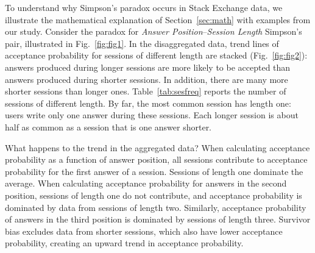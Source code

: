 To understand why Simpson's paradox occurs in Stack Exchange data, we illustrate the mathematical explanation of Section~\ref{sec:math} with examples from our study.
Consider the paradox for \textit{Answer Position}--\textit{Session Length} Simpson's pair, illustrated in Fig.~\ref{fig:fig1}.
In the disaggregated data, trend lines of acceptance probability for sessions of different length are stacked (Fig.~\ref{fig:fig2}): answers produced during longer sessions are more likely to be accepted than answers produced during shorter sessions. In addition, there are many more shorter sessions than longer ones. Table~\ref{tab:sesfreq} reports the number of sessions of different length. By far, the most common session has length one: users write only one answer during these sessions. Each longer session is about half as common as a session that is one answer shorter.

What happens to the trend in the aggregated data?
When calculating acceptance probability as a function of answer position, all sessions contribute to acceptance probability for the first answer of a session. Sessions of length one dominate the average. When calculating acceptance probability for answers in the second position, sessions of length one do not contribute, and acceptance probability is dominated by data from sessions of length two. Similarly, %
acceptance probability of answers in the third position is dominated by sessions of length three. Survivor bias excludes data from shorter sessions, which also have lower acceptance probability, %
creating an upward trend in acceptance probability.



